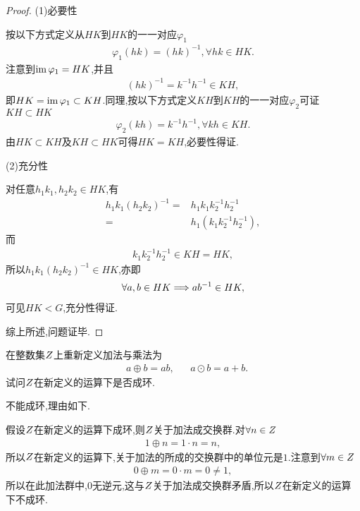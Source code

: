 \begin{proof}
    (1)必要性

    按以下方式定义从$HK$到$HK$的一一对应$\varphi_1$\begin{align*}
        \varphi_1(hk)=(hk)^{-1},\forall hk\in HK.
    \end{align*}注意到$\mathrm{im}\,\varphi_1=HK$,并且\begin{align*}
        (hk)^{-1}=k^{-1}h^{-1}\in KH,
    \end{align*}即$HK=\mathrm{im}\,\varphi_1\subset KH$.同理,按以下方式定义$KH$到$KH$的一一对应$\varphi_2$可证$KH\subset HK$\begin{align*}
        \varphi_2(kh)=k^{-1}h^{-1},\forall kh\in KH.
    \end{align*}由$HK\subset KH$及$KH\subset HK$可得$HK=KH$,必要性得证.

    (2)充分性

    对任意$h_1k_1,h_2k_2\in HK$,有\begin{align*}
        h_1k_1(h_2k_2)^{-1}=&h_1k_1k_2^{-1}h_2^{-1}\\
        =&h_1(k_1k_2^{-1}h_2^{-1}),
    \end{align*}而\begin{align*}
        k_1k_2^{-1}h_2^{-1}\in KH=HK,
    \end{align*}所以$h_1k_1(h_2k_2)^{-1}\in HK$,亦即\begin{align*}
        \forall a,b\in HK\Longrightarrow ab^{-1}\in HK,
    \end{align*}可见$HK<G$,充分性得证.

    综上所述,问题证毕.
\end{proof}
\begin{problem}[P56T28]
    在整数集$\relax{Z}$上重新定义加法与乘法为\begin{align*}
        &a\oplus b=ab,&&a\odot b=a+b.
    \end{align*}试问$\relax{Z}$在新定义的运算下是否成环.
\end{problem}
\begin{solution}
    不能成环,理由如下.

    假设$\relax{Z}$在新定义的运算下成环,则$\relax{Z}$关于加法成交换群.对$\forall n\in\relax{Z}$
    \begin{align*}
        1\oplus n=1\cdot n=n,
    \end{align*}所以$\relax{Z}$在新定义的运算下,关于加法的所成的交换群中的单位元是$1$.注意到$\forall m\in\relax{Z}$\begin{align*}
        0\oplus m=0\cdot m=0\neq1,
    \end{align*}所以在此加法群中,$0$无逆元,这与$\relax{Z}$关于加法成交换群矛盾,所以$\relax{Z}$在新定义的运算下不成环.
\end{solution}
